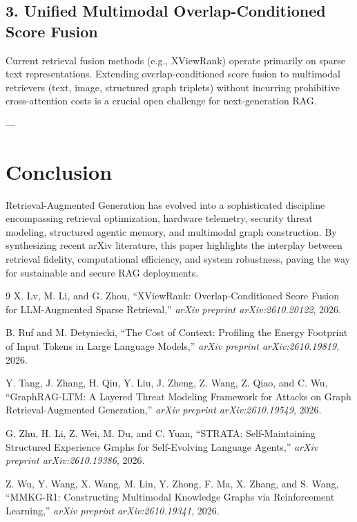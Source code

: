 \documentclass[11pt,a4paper]{article}
\begin{document}
\subsection{3. Unified Multimodal Overlap-Conditioned Score Fusion}
Current retrieval fusion methods (e.g., XViewRank) operate primarily on sparse text representations. Extending overlap-conditioned score fusion to multimodal retrievers (text, image, structured graph triplets) without incurring prohibitive cross-attention costs is a crucial open challenge for next-generation RAG.

---

\section{Conclusion}
Retrieval-Augmented Generation has evolved into a sophisticated discipline encompassing retrieval optimization, hardware telemetry, security threat modeling, structured agentic memory, and multimodal graph construction. By synthesizing recent arXiv literature, this paper highlights the interplay between retrieval fidelity, computational efficiency, and system robustness, paving the way for sustainable and secure RAG deployments.

\begin{thebibliography}{9}
X. Lv, M. Li, and G. Zhou, ``XViewRank: Overlap-Conditioned Score Fusion for LLM-Augmented Sparse Retrieval,'' \emph{arXiv preprint arXiv:2610.20122}, 2026.

B. Ruf and M. Detyniecki, ``The Cost of Context: Profiling the Energy Footprint of Input Tokens in Large Language Models,'' \emph{arXiv preprint arXiv:2610.19819}, 2026.

Y. Tang, J. Zhang, H. Qiu, Y. Liu, J. Zheng, Z. Wang, Z. Qiao, and C. Wu, ``GraphRAG-LTM: A Layered Threat Modeling Framework for Attacks on Graph Retrieval-Augmented Generation,'' \emph{arXiv preprint arXiv:2610.19549}, 2026.

G. Zhu, H. Li, Z. Wei, M. Du, and C. Yuan, ``STRATA: Self-Maintaining Structured Experience Graphs for Self-Evolving Language Agents,'' \emph{arXiv preprint arXiv:2610.19386}, 2026.

Z. Wu, Y. Wang, X. Wang, M. Lin, Y. Zhong, F. Ma, X. Zhang, and S. Wang, ``MMKG-R1: Constructing Multimodal Knowledge Graphs via Reinforcement Learning,'' \emph{arXiv preprint arXiv:2610.19341}, 2026.
\end{thebibliography}
\end{document}
